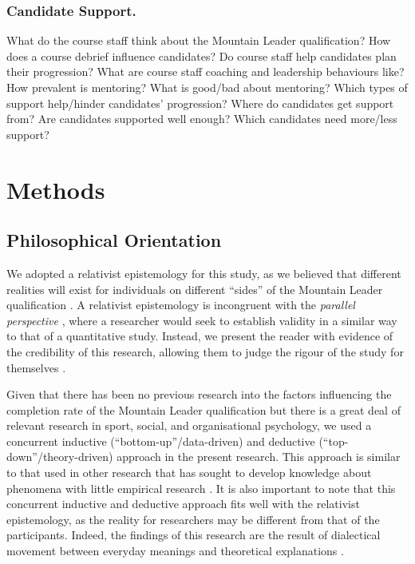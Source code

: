 \documentclass[
  12pt,
  a4paper,
]{book}
\begin{document}
\hypertarget{qual-research-questions-support}{%
\subsubsection{Candidate Support.}\label{qual-research-questions-support}}

What do the course staff think about the Mountain Leader qualification? How does a course debrief influence candidates? Do course staff help candidates plan their progression? What are course staff coaching and leadership behaviours like? How prevalent is mentoring? What is good/bad about mentoring? Which types of support help/hinder candidates' progression? Where do candidates get support from? Are candidates supported well enough? Which candidates need more/less support?

\hypertarget{methods}{%
\section{Methods}\label{methods}}

\hypertarget{philosophical-orientation}{%
\subsection{Philosophical Orientation}\label{philosophical-orientation}}

We adopted a relativist epistemology for this study, as we believed that different realities will exist for individuals on different ``sides'' of the Mountain Leader qualification \citep[e.g., candidates and course staff;][]{Sparkes2009}. A relativist epistemology is incongruent with the \emph{parallel perspective} \citep{Sparkes1998}, where a researcher would seek to establish validity in a similar way to that of a quantitative study. Instead, we present the reader with evidence of the credibility of this research, allowing them to judge the rigour of the study for themselves \citep{Sparkes2009}.

Given that there has been no previous research into the factors influencing the completion rate of the Mountain Leader qualification but there is a great deal of relevant research in sport, social, and organisational psychology, we used a concurrent inductive (``bottom-up''/data-driven) and deductive (``top-down''/theory-driven) approach in the present research. This approach is similar to that used in other research that has sought to develop knowledge about phenomena with little empirical research \citep[e.g.,][]{Webster2017}. It is also important to note that this concurrent inductive and deductive approach fits well with the relativist epistemology, as the reality for researchers may be different from that of the participants. Indeed, the findings of this research are the result of dialectical movement between everyday meanings and theoretical explanations \citep{Sparkes2014}.
\end{document}
